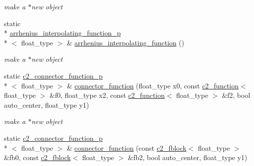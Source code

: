 \begin{DoxyCompactItemize}
\begin{DoxyCompactList}\small\item\em make a $\ast$new object \end{DoxyCompactList}\item 
\hypertarget{classc2__factory_ac2ab3145f84167194ba1ff71aaaa6ffe}{static \\*
\hyperlink{classarrhenius__interpolating__function__p}{arrhenius\-\_\-interpolating\-\_\-function\-\_\-p}\\*
$<$ float\-\_\-type $>$ \& \hyperlink{classc2__factory_ac2ab3145f84167194ba1ff71aaaa6ffe}{arrhenius\-\_\-interpolating\-\_\-function} ()}\label{classc2__factory_ac2ab3145f84167194ba1ff71aaaa6ffe}

\begin{DoxyCompactList}\small\item\em make a $\ast$new object \end{DoxyCompactList}\item 
\hypertarget{classc2__factory_ac8c9d70e5c486a0025e288e5911f2a55}{static \hyperlink{classc2__connector__function__p}{c2\-\_\-connector\-\_\-function\-\_\-p}\\*
$<$ float\-\_\-type $>$ \& \hyperlink{classc2__factory_ac8c9d70e5c486a0025e288e5911f2a55}{connector\-\_\-function} (float\-\_\-type x0, const \hyperlink{classc2__function}{c2\-\_\-function}$<$ float\-\_\-type $>$ \&f0, float\-\_\-type x2, const \hyperlink{classc2__function}{c2\-\_\-function}$<$ float\-\_\-type $>$ \&f2, bool auto\-\_\-center, float\-\_\-type y1)}\label{classc2__factory_ac8c9d70e5c486a0025e288e5911f2a55}

\begin{DoxyCompactList}\small\item\em make a $\ast$new object \end{DoxyCompactList}\item 
\hypertarget{classc2__factory_a6c6d28aecfe189f6eb513ddd8c8a51e1}{static \hyperlink{classc2__connector__function__p}{c2\-\_\-connector\-\_\-function\-\_\-p}\\*
$<$ float\-\_\-type $>$ \& \hyperlink{classc2__factory_a6c6d28aecfe189f6eb513ddd8c8a51e1}{connector\-\_\-function} (const \hyperlink{classc2__fblock}{c2\-\_\-fblock}$<$ float\-\_\-type $>$ \&fb0, const \hyperlink{classc2__fblock}{c2\-\_\-fblock}$<$ float\-\_\-type $>$ \&fb2, bool auto\-\_\-center, float\-\_\-type y1)}\label{classc2__factory_a6c6d28aecfe189f6eb513ddd8c8a51e1}


\end{DoxyCompactItemize}
